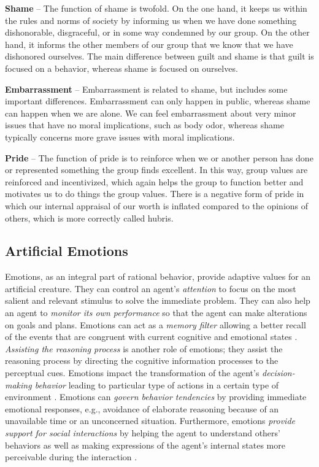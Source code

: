 \documentclass[12pt]{report}
\begin{document}
\noindent \textbf{Shame} -- The function of shame is twofold. On the one hand,
it keeps us within the rules and norms of society by informing us when we have
done something dishonorable, disgraceful, or in some way condemned by our group.
On the other hand, it informs the other members of our group that we know that
we have dishonored ourselves. The main difference between guilt and shame is
that guilt is focused on a behavior, whereas shame is focused on ourselves.

\noindent \textbf{Embarrassment} -- Embarrassment is related to shame, but
includes some important differences. Embarrassment can only happen in public,
whereas shame can happen when we are alone. We can feel embarrassment about very
minor issues that have no moral implications, such as body odor, whereas shame
typically concerns more grave issues with moral implications.

\noindent \textbf{Pride} -- The function of pride is to reinforce when we or
another person has done or represented something the group finds excellent. In
this way, group values are reinforced and incentivized, which again helps the
group to function better and motivates us to do things the group values. There
is a negative form of pride in which our internal appraisal of our worth is
inflated compared to the opinions of others, which is more correctly called
hubris.

\subsection{Artificial Emotions}
\label{sec:artificial-emotions}
Emotions, as an integral part of rational behavior, provide adaptive values for
an artificial creature. They can control an agent's \textit{attention} to focus
on the most salient and relevant stimulus to solve the immediate problem. They
can also help an agent to \textit{monitor its own performance} so that the agent
can make alterations on goals and plans. Emotions can act as a \textit{memory
filter} allowing a better recall of the events that are congruent with current
cognitive and emotional states \cite{brave:emotion-hci}. \textit{Assisting the
reasoning process} is another role of emotions; they assist the reasoning
process by directing the cognitive information processes to the perceptual cues.
Emotions impact the transformation of the agent's \textit{decision-making
behavior} \cite{gmytrasiewicz:emotion-agent-decision} leading to particular type
of actions in a certain type of environment \cite{zhu:emotion-action}. Emotions
can \textit{govern behavior tendencies} by providing immediate emotional
responses, e.g., avoidance of elaborate reasoning because of an unavailable time
or an unconcerned situation. Furthermore, emotions \textit{provide support for
social interactions} by helping the agent to understand others' behaviors as
well as making expressions of the agent's internal states more perceivable
during the interaction \cite{gadanho:learning-emotions}.
\end{document}

